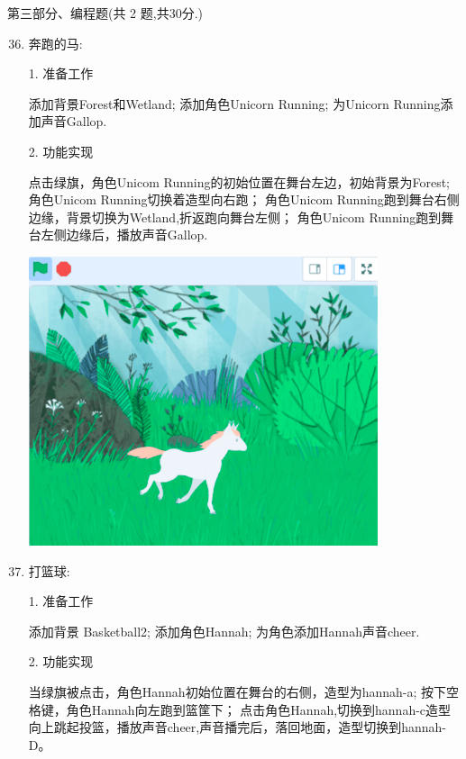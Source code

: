 \documentclass[10pt, a4paper]{article}
\begin{document}
    {\noindent\heiti 第三部分、编程题(共 2 题,共30分.)}
    \begin{enumerate}
        \setcounter{enumi}{35}
        
        \item 奔跑的马:
        
        1. 准备工作
        \begin{tasks}[label = (\arabic*)]
            \task 添加背景Forest和Wetland;
            \task 添加角色Unicorn Running;
            \task 为Unicorn Running添加声音Gallop.
        \end{tasks}
        2. 功能实现
        \begin{tasks}[label = (\arabic*)]
            \task 点击绿旗，角色Unicom Running的初始位置在舞台左边，初始背景为Forest;
            \task 角色Unicom Running切换着造型向右跑；
            \task 角色Unicom Running跑到舞台右侧边缘，背景切换为Wetland,折返跑向舞台左侧；
            \task 角色Unicom Running跑到舞台左侧边缘后，播放声音Gallop.
        \end{tasks}

        \begin{center}
            \includegraphics[width=.4\textwidth]{36.png}
        \end{center}

        \item 打篮球:
        
        1. 准备工作
        \begin{tasks}[label = (\arabic*)]
            \task 添加背景 Basketball2;
            \task 添加角色Hannah;
            \task 为角色添加Hannah声音cheer.
        \end{tasks}
        2. 功能实现
        \begin{tasks}[label = (\arabic*)]
            \task 当绿旗被点击，角色Hannah初始位置在舞台的右侧，造型为hannah-a;
            \task 按下空格键，角色Hannah向左跑到篮筐下；
            \task 点击角色Hannah,切换到hannah-c造型向上跳起投篮，播放声音cheer,声音播完后，落回地面，造型切换到hannah-D。
        \end{tasks}


\end{enumerate}
\end{document}

